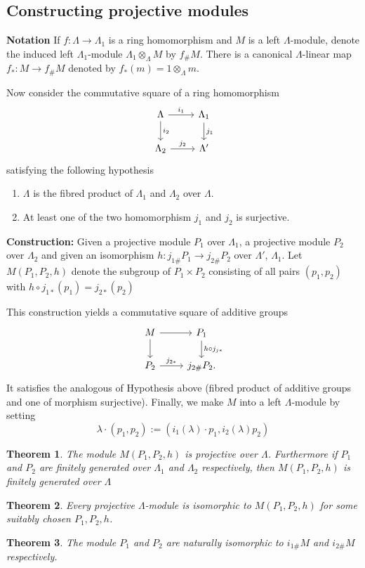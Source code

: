 \documentclass[11pt]{article}
\newtheorem{thm}{Theorem}[section]
\newcommand{\rta}{\rightarrow}
\newcommand{\lrta}{\longrightarrow}
\begin{document}
\subsection*{Constructing projective modules}
\textbf{Notation} If $f:\Lambda\lrta \Lambda_1$ is a ring homomorphism and $M$ is a left $\Lambda$-module, denote the induced left $\Lambda_1$-module $\Lambda_1\otimes_\Lambda M$ by $f_\# M$. There is a canonical $\Lambda$-linear map $f_*:M\lrta f_\# M$ denoted by $f_*(m)=1\otimes_\Lambda m$.

Now consider the commutative square of a ring homomorphism 
\[
\begin{tikzcd}
\Lambda\ar[r,"i_1"]\ar[d,"i_2"] & \Lambda_1 \ar[d,"j_1"]\\
\Lambda_2 \ar[r,"j_2"] & \Lambda'
\end{tikzcd}
\]
satisfying the following hypothesis
\begin{enumerate}
\item $\Lambda $ is the fibred product of $\Lambda_1$ and $\Lambda_2$ over $\Lambda$.
\item  At least one of the two homomorphism $j_1$ and $j_2$ is surjective.
\end{enumerate}	
\textbf{Construction:} Given a projective module $P_1$ over $\Lambda_1$, a projective module $P_2$ over $\Lambda_2$ and given an isomorphism $h:j_{1\#}P_1\rta j_{2\#}P_2$ over $\Lambda'$, $\Lambda_1$. Let $M(P_1,P_2,h)$ denote the subgroup of $P_1\times P_2$ consisting of all pairs $(p_1,p_2)$ with $h\circ j_{1*}(p_1)=j_{2*}(p_2)$


This construction yields a commutative square of additive groups 
\[
\begin{tikzcd}
M\ar[r]\ar[d] & P_1 \ar[d,"h\circ j_{j*}"]\\
P_2 \ar[r,"j_{2*}"] & j_{2\#}P_2.
\end{tikzcd}
\]
It satisfies the analogous of Hypothesis above (fibred product of additive groups and one of morphism surjective). Finally, we make $M$ into a left $\Lambda$-module by setting
$$
\lambda\cdot (p_1,p_2):=(i_1 (\lambda)\cdot p_1, i_{2}(\lambda)p_2)
$$

\begin{thm}
The module $M(P_1,P_2,h)$ is projective over $\Lambda$. Furthermore if $P_1$ and $P_2$ are finitely generated over $\Lambda_1$ and $\Lambda_2$ respectively, then $M(P_1,P_2,h)$ is finitely generated over $\Lambda$
\end{thm}

\begin{thm}
 Every projective $\Lambda$-module is isomorphic to $M(P_1,P_2,h)$ for some suitably chosen $P_1,P_2,h$.
\end{thm}

\begin{thm}
The module $P_1$ and $P_2$ are naturally isomorphic to $i_{1\#} M$ and $i_{2\#} M$ respectively.
\end{thm}
\end{document}
